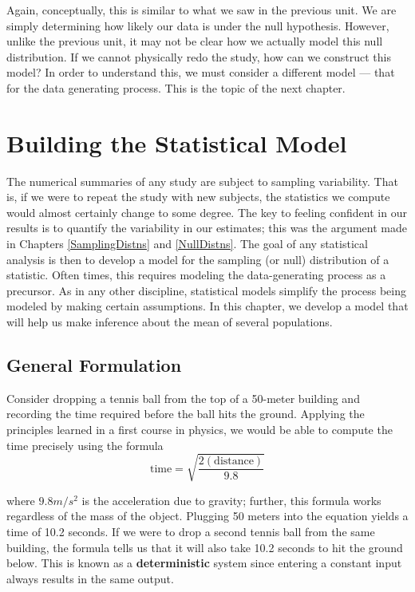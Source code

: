 \documentclass[]{book}
\theoremstyle{definition}
\theoremstyle{definition}
\theoremstyle{remark}
\begin{document}
Again, conceptually, this is similar to what we saw in the previous
unit. We are simply determining how likely our data is under the null
hypothesis. However, unlike the previous unit, it may not be clear how
we actually model this null distribution. If we cannot physically redo
the study, how can we construct this model? In order to understand this,
we must consider a different model --- that for the data generating
process. This is the topic of the next chapter.

\chapter{Building the Statistical Model}\label{ANOVAmodel}

The numerical summaries of any study are subject to sampling
variability. That is, if we were to repeat the study with new subjects,
the statistics we compute would almost certainly change to some degree.
The key to feeling confident in our results is to quantify the
variability in our estimates; this was the argument made in Chapters
\ref{SamplingDistns} and \ref{NullDistns}. The goal of any statistical
analysis is then to develop a model for the sampling (or null)
distribution of a statistic. Often times, this requires modeling the
data-generating process as a precursor. As in any other discipline,
statistical models simplify the process being modeled by making certain
assumptions. In this chapter, we develop a model that will help us make
inference about the mean of several populations.

\section{General Formulation}\label{general-formulation}

Consider dropping a tennis ball from the top of a 50-meter building and
recording the time required before the ball hits the ground. Applying
the principles learned in a first course in physics, we would be able to
compute the time precisely using the formula
\[\text{time} = \sqrt{\frac{2(\text{distance})}{9.8}}\]

where \(9.8 m/s^2\) is the acceleration due to gravity; further, this
formula works regardless of the mass of the object. Plugging 50 meters
into the equation yields a time of 10.2 seconds. If we were to drop a
second tennis ball from the same building, the formula tells us that it
will also take 10.2 seconds to hit the ground below. This is known as a
\textbf{deterministic} system since entering a constant input always
results in the same output.
\end{document}
